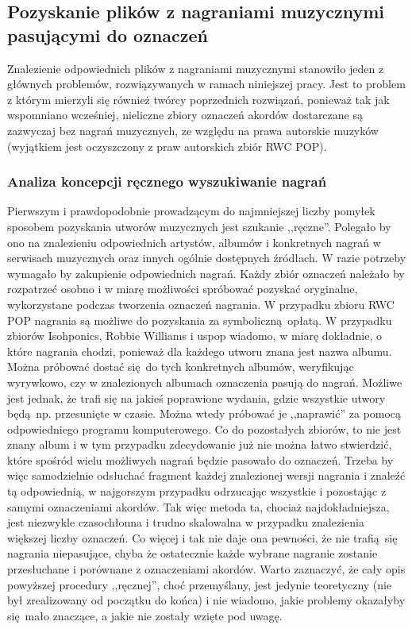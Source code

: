 \subsection{Pozyskanie plików z nagraniami muzycznymi pasującymi do oznaczeń}

Znalezienie odpowiednich plików z nagraniami muzycznymi stanowiło jeden z głównych problemów,
rozwiązywanych w ramach niniejszej pracy. Jest to problem z którym mierzyli się również twórcy
poprzednich rozwiązań, ponieważ tak jak wspomniano wcześniej, nieliczne zbiory oznaczeń
akordów dostarczane są zazwyczaj bez nagrań muzycznych, ze względu na prawa autorskie muzyków
(wyjątkiem jest oczyszczony z praw autorskich zbiór RWC POP).

\subsubsection{Analiza koncepcji ręcznego wyszukiwanie nagrań} Pierwszym i prawdopodobnie
prowadzącym do najmniejszej liczby pomyłek sposobem pozyskania utworów muzycznych jest szukanie
,,ręczne''. Polegało by ono na znalezieniu odpowiednich artystów, albumów i konkretnych nagrań w
serwisach muzycznych oraz innych ogólnie dostępnych źródłach. W razie potrzeby wymagało by
zakupienie odpowiednich nagrań. Każdy zbiór oznaczeń należało by rozpatrzeć osobno i w miarę
możliwości spróbować pozyskać oryginalne, wykorzystane podczas tworzenia oznaczeń nagrania. W
przypadku zbioru RWC POP nagrania są możliwe do pozyskania za symboliczną opłatą. W przypadku
zbiorów Isohponics, Robbie Williams i uspop wiadomo, w miarę dokładnie, o które nagrania chodzi,
ponieważ dla każdego utworu znana jest nazwa albumu. Można próbować dostać się do tych konkretnych
albumów, weryfikując wyrywkowo, czy w znalezionych albumach oznaczenia pasują do nagrań. Możliwe
jest jednak, że trafi się na jakieś poprawione wydania, gdzie wszystkie utwory będą np. przesunięte
w czasie. Można wtedy próbować je ,,naprawić'' za pomocą odpowiedniego programu komputerowego. Co do
pozostałych zbiorów, to nie jest znany album i w tym przypadku zdecydowanie już nie można łatwo
stwierdzić, które spośród wielu możliwych nagrań będzie pasowało do oznaczeń. Trzeba by więc
samodzielnie odsłuchać fragment każdej znalezionej wersji nagrania i znaleźć tą odpowiednią, w
najgorszym przypadku odrzucając wszystkie i pozostając z samymi oznaczeniami akordów. Tak więc
metoda ta, chociaż najdokładniejsza, jest niezwykle czasochłonna i trudno skalowalna w przypadku
znalezienia większej liczby oznaczeń.  Co więcej i tak nie daje ona pewności, że nie trafią się
nagrania niepasujące, chyba że ostatecznie każde wybrane nagranie zostanie przesłuchane i porównane
z oznaczeniami akordów. Warto zaznaczyć, że cały opis powyższej procedury ,,ręcznej'', choć
przemyślany, jest jedynie teoretyczny (nie był zrealizowany od początku do końca) i nie wiadomo,
jakie problemy okazałyby się mało znaczące, a jakie nie zostały wzięte pod uwagę. 

